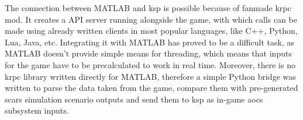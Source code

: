         The connection between MATLAB and \ac{ksp} is possible because of fanmade \ac{krpc} mod. It creates a API server running alongside the game, with which calls can be made using already written clients in most popular languages, like C++, Python, Lua, Java, etc. Integrating it with MATLAB has proved to be a difficult task, as MATLAB doesn't provide simple means for threading, which means that inputs for the game have to be precalculated to work in real time. Moreover, there is no \ac{krpc} library written directly for MATLAB, therefore a simple Python bridge was written to parse the data taken from the game, compare them with pre-generated \ac{scars} simulation scenario outputs and send them to \ac{ksp} as in-game \ac{aocs} subsystem inputs.


